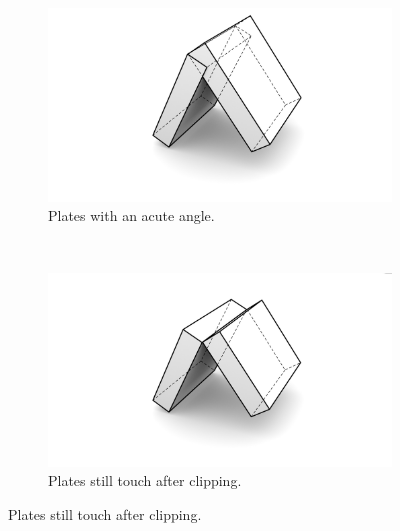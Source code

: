 \documentclass[../ClassicThesis.tex]{subfiles}
\begin{document}
\begin{figure}[!ht]
\centering
\begin{subfigure}[b]{0.45\textwidth}
\includegraphics[width=\columnwidth]{Images/Blocks_One_Edge.png}
\caption{Plates with an acute angle.}
\end{subfigure}
~
\begin{subfigure}[b]{0.45\textwidth}
\includegraphics[width=\columnwidth]{Images/Blocks_One_Edge_shortened.png}
\caption{Plates still touch after clipping.}
\end{subfigure}


\end{figure}
\end{document}
